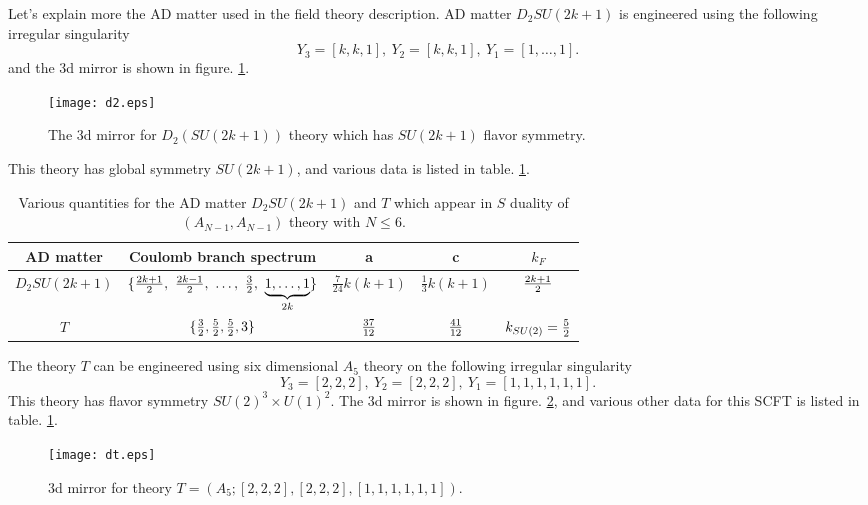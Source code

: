 \documentclass[a4paper,11pt]{article}
\begin{document}
Let's explain more the AD matter used in the field theory description.
AD matter $D_2SU(2k+1)$ is engineered using the following irregular singularity 
\begin{equation}
Y_3=[k,k,1],~Y_2=[k,k,1],~Y_1=[1,\ldots,1].
\end{equation}
and the 3d mirror is shown in figure. \ref{AD2}.
\begin{figure}[h]
\centering
  \texttt{[image: d2.eps]}
  \caption{The 3d mirror for $D_2(SU(2k+1))$ theory which has $SU(2k+1)$ flavor symmetry.}
  \label{AD2}
\end{figure}
This theory has global symmetry $SU(2k+1)$, and various data is listed in table. \ref{ADdata}.
\begin{table}[!htb]
\begin{center}
  \begin{tabular}{ |c|c|c|c|c|}
    \hline
     AD matter & Coulomb branch spectrum & a&c &$k_F$\\ \hline
     $D_2SU(2k+1)$ & $\{ {2k+1\over 2},~{2k-1\over 2},~\ldots,~{3\over2},~\underbrace{1,\ldots,1}_{2k} \}$& $\frac{7}{24} k (k+1)$ & $\frac{1}{3} k (k+1)$&${2k+1\over 2}$ \\ \hline
     $T$&$\{{3\over2},{5\over2},{5\over2},3\}$&${37\over12}$&${41\over12}$&$k_{SU(2)}={5\over2}$\\ \hline
  \end{tabular}
  \end{center}
  \caption{Various quantities for the AD matter $D_2SU(2k+1)$ and $T$ which appear in $S$ duality of $(A_{N-1}, A_{N-1})$ theory with $N\leq 6$.}
  \label{ADdata}
\end{table}
The theory $T$ can be engineered using six dimensional $A_5$ theory on the following irregular singularity 
\begin{equation}
Y_3=[2,2,2],~Y_2=[2,2,2],~Y_1=[1,1,1,1,1,1].
\end{equation}
This theory has flavor symmetry $SU(2)^3\times U(1)^2$. The 3d mirror is shown in figure. \ref{TT}, and various other data for this SCFT is listed in table. \ref{ADdata}. 
\begin{figure}[h]
\centering
  \texttt{[image: dt.eps]}
  \caption{3d mirror for theory $T=(A_5;[2,2,2],[2,2,2],[1,1,1,1,1,1])$. }
  \label{TT}
\end{figure}
\end{document}
